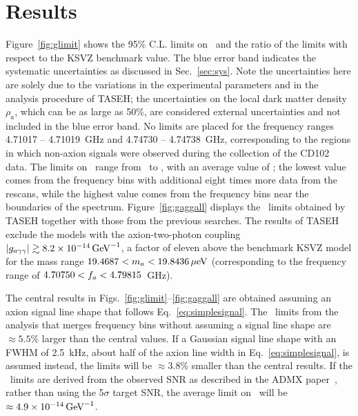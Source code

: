 \section{Results} \label{sec:results}

Figure~\ref{fig:glimit} shows the 95\% C.L. limits on \gagg\ and the ratio of the limits  
with respect to the KSVZ benchmark value.  
The blue error band indicates the systematic uncertainties as discussed in 
Sec.~\ref{sec:sys}. Note the uncertainties here are solely due to the 
variations in the experimental parameters and in the analysis procedure 
of TASEH; the uncertainties on the local dark matter density $\rho_a$,
 which can be as large as 50\%, are considered external uncertainties 
and not included in the blue error band.  
No limits are placed for the frequency ranges  
4.71017 -- 4.71019~GHz and 4.74730 -- 4.74738~GHz, corresponding to 
the regions in which non-axion signals were observed 
during the collection of the CD102 data. The limits on 
\gagg\ range from \lolimit\GeVinv\ to \hilimit\GeVinv, with an average 
value of \avelimit\GeVinv; the lowest value comes from the frequency bins with 
additional eight times more data from the rescans, while the highest value 
comes from the frequency bins near the boundaries of the spectrum. 
Figure~\ref{fig:gaggall} displays the \gagg\ limits obtained by TASEH 
together with those from the previous searches. 
The results of TASEH exclude the models with the axion-two-photon coupling 
$\left|g_{a\gamma\gamma}\right|\gtrsim 8.2\times 10^{-14}\,\text{Ge\hspace{-.08em}V}^{-1}$, a factor of eleven above the benchmark
KSVZ model for the mass range $19.4687 < m_a < 19.8436 \,\mu\text{e\hspace{-.08em}V}$ (corresponding to 
the frequency range of $4.70750 < f_a < 4.79815$~GHz). 


The central results in Figs.~\ref{fig:glimit}--\ref{fig:gaggall} are 
obtained assuming an axion signal line shape that follows 
Eq.~\eqref{eq:simplesignal}. The \gagg\ limits from the analysis that merges 
frequency bins without 
assuming a signal line shape 
are $\approx5.5$\% larger than the central values. 
If a Gaussian signal line shape with an FWHM of 2.5~kHz,  
about half of the axion line width in Eq.~\eqref{eq:simplesignal}, is 
assumed instead, the limits will be $\approx3.8$\% smaller than the central 
results. 
If the \gagg\ limits are derived from the observed SNR as described in the 
ADMX paper~\cite{ADMXVIII}, 
rather than using the 5$\sigma$ target SNR, the average limit on \gagg\ will 
be $\approx4.9\times 10^{-14}\,\text{Ge\hspace{-.08em}V}^{-1}$. 



